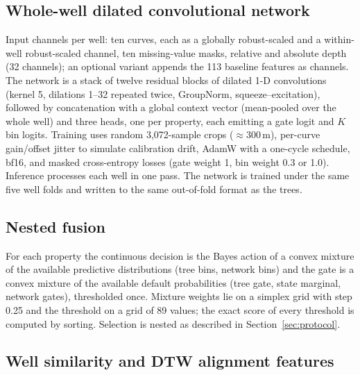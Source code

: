 \documentclass[preprint,12pt]{elsarticle}
\begin{document}
\subsection{Whole-well dilated convolutional network}
\label{sec:net}

Input channels per well: ten curves, each as a globally robust-scaled and a within-well robust-scaled channel, ten missing-value masks, relative and absolute depth (32 channels); an optional variant appends the 113 baseline features as channels. The network is a stack of twelve residual blocks of dilated 1-D convolutions \cite{bai2018tcn} (kernel 5, dilations 1--32 repeated twice, GroupNorm, squeeze--excitation), followed by concatenation with a global context vector (mean-pooled over the whole well) and three heads, one per property, each emitting a gate logit and $K$ bin logits. Training uses random 3,072-sample crops ($\approx 300$\,m), per-curve gain/offset jitter to simulate calibration drift, AdamW with a one-cycle schedule, bf16, and masked cross-entropy losses (gate weight 1, bin weight 0.3 or 1.0). Inference processes each well in one pass. The network is trained under the same five well folds and written to the same out-of-fold format as the trees.

\subsection{Nested fusion}
\label{sec:fusion}

For each property the continuous decision is the Bayes action of a convex mixture of the available predictive distributions (tree bins, network bins) and the gate is a convex mixture of the available default probabilities (tree gate, state marginal, network gates), thresholded once. Mixture weights lie on a simplex grid with step 0.25 and the threshold on a grid of 89 values; the exact score of every threshold is computed by sorting. Selection is nested as described in Section~\ref{sec:protocol}.

\subsection{Well similarity and DTW alignment features}
\label{sec:alignment_methods}
\end{document}
